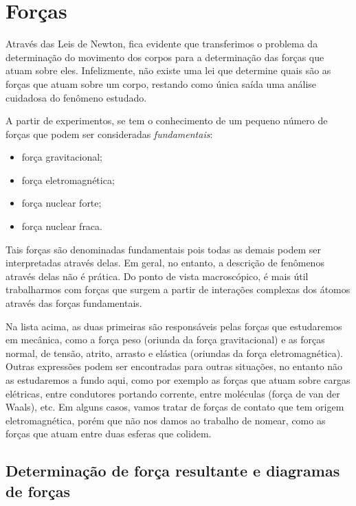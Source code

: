 \section{Forças}

Através das Leis de Newton, fica evidente que transferimos o problema da determinação do movimento dos corpos para a determinação das forças que atuam sobre eles. Infelizmente, não existe uma lei que determine quais são as forças que atuam sobre um corpo, restando como única saída uma análise cuidadosa do fenômeno estudado.

A partir de experimentos, se tem o conhecimento de um pequeno número de forças que podem ser consideradas \emph{fundamentais}:
\begin{itemize}
  \item força gravitacional;
  \item força eletromagnética;
  \item força nuclear forte;
  \item força nuclear fraca.
\end{itemize}
%
Tais forças são denominadas fundamentais pois todas as demais podem ser interpretadas através delas. Em geral, no entanto, a descrição de fenômenos através delas não é prática. Do ponto de vista macroscópico, é mais útil trabalharmos com forças que surgem a partir de interações complexas dos átomos através das forças fundamentais.

Na lista acima, as duas primeiras são responsáveis pelas forças que estudaremos em mecânica, como a força peso (oriunda da força gravitacional) e as forças normal, de tensão, atrito, arrasto e elástica (oriundas da força eletromagnética). Outras expressões podem ser encontradas para outras situações, no entanto não as estudaremos a fundo aqui, como por exemplo as forças que atuam sobre cargas elétricas, entre condutores portando corrente, entre moléculas (força de van der Waals), etc. Em alguns casos, vamos tratar de forças de contato que tem origem eletromagnética, porém que não nos damos ao trabalho de nomear, como as forças que atuam entre duas esferas que colidem.

\subsection{Determinação de força resultante e diagramas de forças} 

